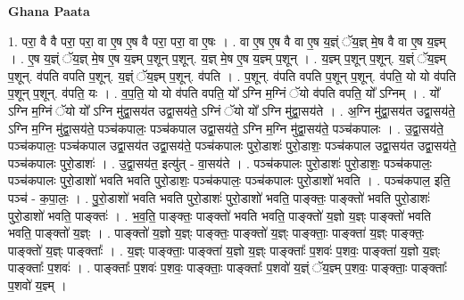\documentclass[17pt]{extarticle}
\begin{document}
\textbf{Ghana Paata } \newline

1. परा॒ वै वै परा॒ परा॒ वा ए॒ष ए॒ष वै परा॒ परा॒ वा ए॒षः । . वा ए॒ष ए॒ष वै वा ए॒ष य॒ज्ञ्ं ॅय॒ज्ञ् मे॒ष वै वा ए॒ष य॒ज्ञ्म् । . ए॒ष य॒ज्ञ्ं ॅय॒ज्ञ् मे॒ष ए॒ष य॒ज्ञ्म् प॒शून् प॒शून्. य॒ज्ञ् मे॒ष ए॒ष य॒ज्ञ्म् प॒शून् । . य॒ज्ञ्म् प॒शून् प॒शून्. य॒ज्ञ्ं ॅय॒ज्ञ्म् प॒शून्. व॑पति वपति प॒शून्. य॒ज्ञ्ं ॅय॒ज्ञ्म् प॒शून्. व॑पति । . प॒शून्. व॑पति वपति प॒शून् प॒शून्. व॑पति॒ यो यो व॑पति प॒शून् प॒शून्. व॑पति॒ यः । . व॒प॒ति॒ यो यो व॑पति वपति॒ यो᳚ ऽग्नि म॒ग्निं ॅयो व॑पति वपति॒ यो᳚ ऽग्निम् । . यो᳚ ऽग्नि म॒ग्निं ॅयो यो᳚ ऽग्नि मु॑द्वा॒सय॑त उद्वा॒सय॑ते॒ ऽग्निं ॅयो यो᳚ ऽग्नि मु॑द्वा॒सय॑ते । . अ॒ग्नि मु॑द्वा॒सय॑त उद्वा॒सय॑ते॒ ऽग्नि म॒ग्नि मु॑द्वा॒सय॑ते॒ पञ्च॑कपालः॒ पञ्च॑कपाल उद्वा॒सय॑ते॒ ऽग्नि म॒ग्नि मु॑द्वा॒सय॑ते॒ पञ्च॑कपालः । . उ॒द्वा॒सय॑ते॒ पञ्च॑कपालः॒ पञ्च॑कपाल उद्वा॒सय॑त उद्वा॒सय॑ते॒ पञ्च॑कपालः पुरो॒डाशः॑ पुरो॒डाशः॒ पञ्च॑कपाल उद्वा॒सय॑त उद्वा॒सय॑ते॒ पञ्च॑कपालः पुरो॒डाशः॑ । . उ॒द्वा॒सय॑त॒ इत्यु॑त् - वा॒सय॑ते । . पञ्च॑कपालः पुरो॒डाशः॑ पुरो॒डाशः॒ पञ्च॑कपालः॒ पञ्च॑कपालः पुरो॒डाशो॑ भवति भवति पुरो॒डाशः॒ पञ्च॑कपालः॒ पञ्च॑कपालः पुरो॒डाशो॑ भवति । . पञ्च॑कपाल॒ इति॒ पञ्च॑ - क॒पा॒लः॒ । . पु॒रो॒डाशो॑ भवति भवति पुरो॒डाशः॑ पुरो॒डाशो॑ भवति॒ पाङ्क्तः॒ पाङ्क्तो॑ भवति पुरो॒डाशः॑ पुरो॒डाशो॑ भवति॒ पाङ्क्तः॑ । . भ॒व॒ति॒ पाङ्क्तः॒ पाङ्क्तो॑ भवति भवति॒ पाङ्क्तो॑ य॒ज्ञो य॒ज्ञ्ः पाङ्क्तो॑ भवति भवति॒ पाङ्क्तो॑ य॒ज्ञ्ः । . पाङ्क्तो॑ य॒ज्ञो य॒ज्ञ्ः पाङ्क्तः॒ पाङ्क्तो॑ य॒ज्ञ्ः पाङ्क्ताः॒ पाङ्क्ता॑ य॒ज्ञ्ः पाङ्क्तः॒ पाङ्क्तो॑ य॒ज्ञ्ः पाङ्क्ताः᳚ । . य॒ज्ञ्ः पाङ्क्ताः॒ पाङ्क्ता॑ य॒ज्ञो य॒ज्ञ्ः पाङ्क्ताः᳚ प॒शवः॑ प॒शवः॒ पाङ्क्ता॑ य॒ज्ञो य॒ज्ञ्ः पाङ्क्ताः᳚ प॒शवः॑ । . पाङ्क्ताः᳚ प॒शवः॑ प॒शवः॒ पाङ्क्ताः॒ पाङ्क्ताः᳚ प॒शवो॑ य॒ज्ञ्ं ॅय॒ज्ञ्म् प॒शवः॒ पाङ्क्ताः॒ पाङ्क्ताः᳚ प॒शवो॑ य॒ज्ञ्म् । \newline
\end{document}
